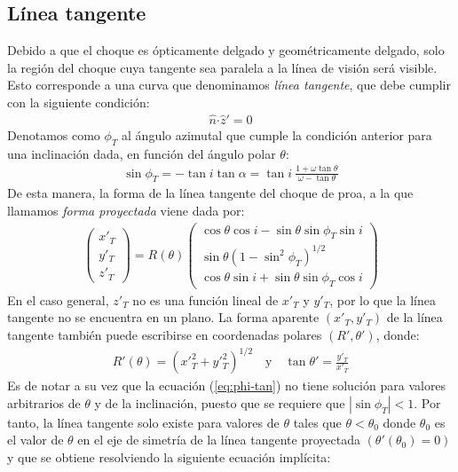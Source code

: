 \subsection{Línea tangente}
\label{sec:tangent-line}
Debido a que el choque es ópticamente delgado y geométricamente delgado, solo la región del choque cuya tangente sea paralela a la
línea de visión será visible. Esto corresponde a una curva que denominamos \textit{línea tangente}, que debe cumplir con la siguiente
condición:
\begin{align}
  \hat{n}\boldsymbol{\cdot} \hat{z}' = 0
\end{align}
Denotamos como $\phi_T$ al ángulo azimutal que cumple la condición anterior para una inclinación dada, en función del ángulo polar $\theta$:
\begin{align}
  \sin\phi_T = -\tan i\tan\alpha = \tan i~\frac{1+\omega\tan\theta}{\omega-\tan\theta}
  \label{eq:phi-tan}
\end{align}
De esta manera, la forma de la línea tangente del choque de proa, a la que llamamos \textit{forma proyectada} viene dada por:
\begin{align}
  \left(
  \begin{array}{c}
    x'_T \\
    y'_T \\
    z'_T
  \end{array}
  \right) =
  R(\theta)\left(
  \begin{array}{c}
    \cos\theta\cos i - \sin\theta\sin\phi_T\sin i \\
    \sin\theta\left(1-\sin^2\phi_T\right)^{1/2} \\
    \cos\theta\sin i + \sin\theta\sin\phi_T\cos i
  \end{array}
  \right) \label{eq:proj-shape}
\end{align}
En el caso general, $z'_T$ no es una función lineal de $x'_T$ y $y'_T$, por lo que la línea tangente no se encuentra en un plano. La forma aparente $(x'_T, y'_T)$  de la línea tangente también puede escribirse en coordenadas polares $(R', \theta')$, donde:
\begin{align}
  R'(\theta) = \left(x'^2_T + y'^2_T\right)^{1/2} \quad \mathrm{y} \quad \tan\theta' = \frac{y'_T}{x'_T}
  \label{eq:polar}
\end{align}
Es de notar a su vez que la ecuación (\ref{eq:phi-tan}) no tiene solución para valores arbitrarios de $\theta$ y de la inclinación, puesto que se requiere que $\left|\sin\phi_T\right| < 1$. Por tanto, la línea tangente solo existe para valores de $\theta$ tales que $\theta < \theta_0$ donde $\theta_0$ es el valor de $\theta$ en el eje de simetría de la línea tangente proyectada $(\theta'(\theta_0) = 0)$ y que se obtiene resolviendo la siguiente ecuación implícita:
